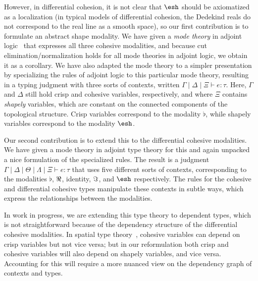 \documentclass{article}
\begin{document}
However, in differential cohesion, it is not clear that $\shape$ should be
axiomatized as a localization (in typical models of differential cohesion, the
Dedekind reals do not correspond to the real line as a smooth space), so our
first contribution is to formulate an abstract shape modality. We have given a
\emph{mode theory} in adjoint logic~\citep{Licata2017} that expresses all three
cohesive modalities, and because cut elimination/normalization holds for all
mode theories in adjoint logic, we obtain it as a corollary. We have also
adapted the mode theory to a simpler presentation by specializing the rules of
adjoint logic to this particular mode theory, resulting in a typing judgment
with three sorts of contexts, written
$\Gamma \mid \Delta \mid \Xi \vdash e : \tau$. Here, $\Gamma$ and $\Delta$ still
hold crisp and cohesive variables, respectively, and where $\Xi$ contains
\emph{shapely} variables, which are constant on the connected components of the
topological structure. Crisp variables correspond to the modality $\flat$, while
shapely variables correspond to the modality $\shape$.

Our second contribution is to extend this to the differential cohesive
modalities.  We have given a mode theory in adjoint type theory for this
and again unpacked a nice formulation of the specialized rules.  The
result is a judgment $\Gamma \mid \Delta \mid \Theta \mid \Lambda \mid
\Xi \vdash e : \tau$ that uses five different sorts of contexts,
corresponding to the modalities $\flat$, $\Re$, identity, $\Im$, and
$\shape$ respectively.  The rules for the cohesive and differential
cohesive types manipulate these contexts in subtle ways, which express
the relationships between the modalities.

In work in progress, we are extending this type theory to dependent types, which
is not straightforward because of the dependency structure of the differential
cohesive modalities. In spatial type theory~\citep{Shulman2015}, cohesive
variables can depend on crisp variables but not vice versa; but in our
reformulation both crisp and cohesive variables will also depend on shapely
variables, and vice versa. Accounting for this will require a more nuanced view
on the dependency graph of contexts and types.

\end{document}
